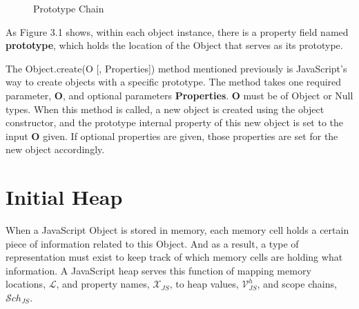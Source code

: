 \documentclass[a4paper,11pt,twoside]{report}
\begin{document}
\begin{figure}[!h]
\begin{center}
\caption{Prototype Chain}
\label{fig:initheap}
\end{center}
\end{figure}

As Figure 3.1 shows, within each object instance, there is a property field named \textbf{prototype}, which holds the location of the Object that serves as its prototype.

The Object.create(O [, Properties]) method mentioned previously is JavaScript's way to create objects with a specific prototype. The method takes one required parameter, \textbf{O}, and optional parameters \textbf{Properties}. \textbf{O} must be of Object or Null types. When this method is called, a new object is created using the object constructor, and the prototype internal property of this new object is set to the input \textbf{O} given. If optional properties are given, those properties are set for the new object accordingly.

\section{Initial Heap}\label{sec:jsheap}
When a JavaScript Object is stored in memory, each memory cell holds a certain piece of information related to this Object. And as a result, a type of representation must exist to keep track of which memory cells are holding what information. A JavaScript heap serves this function of mapping memory locations, $\mathcal{L}$, and property names, $\mathcal{X}_{JS}$, to heap values, $\mathcal{V}_{JS}^h$, and scope chains, $\mathcal{S}ch_{JS}$. 
\end{document}
